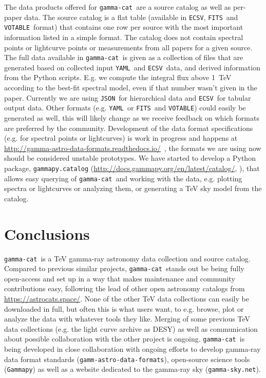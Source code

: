 \documentclass[11pt,twoside]{article}
\newcommand{\gammacat}{\texttt{gamma-cat}}
\newcommand{\gammapy}{\texttt{Gammapy}}
\newcommand{\gadf}{\texttt{gamm-astro-data-formats}}
\newcommand{\gammasky}{\texttt{gamma-sky.net}}
\newcommand{\yaml}{\texttt{YAML}}
\newcommand{\ecsv}{\texttt{ECSV}}
\newcommand{\fits}{\texttt{FITS}}
\newcommand{\votable}{\texttt{VOTABLE}}
\newcommand{\json}{\texttt{JSON}}
\newcommand{\astrocats}{\url{https://astrocats.space/}}
\newcommand{\gadfurl}{\url{http://gamma-astro-data-formats.readthedocs.io/}}
\newcommand{\gammapycat}{\url{http://docs.gammapy.org/en/latest/catalog/}}
\begin{document}
The data products offered for \gammacat\ are a source catalog as well as
per-paper data. The source catalog is a flat table (available in \ecsv, \fits\
and \votable\ format) that contains one row per source with the most important
information listed in a simple format. The catalog does not contain spectral
points or lightcurve points or measurements from all papers for a given source.
The full data available in \gammacat\ is given as a collection of files that are
generated based on collected input \yaml\ and \ecsv\ data, and derived
information from the Python scripts. E.g. we compute the integral flux above
1~TeV according to the best-fit spectral model, even if that number wasn't given
in the paper. Currently we are using \json\ for hierarchical data and \ecsv\ for
tabular output data. Other formats (e.g. \yaml\ or \fits\ and \votable) could
easily be generated as well, this will likely change as we receive feedback on
which formats are preferred by the community. Development of the data format
specifications (e.g. for spectral points or lightcurves) is work in progress and
happens at \gadfurl\ \citep{open-gamma}, the formats we are using now should be
considered unstable prototypes. We have started to develop a Python package,
\texttt{gammapy.catalog} (\gammapycat, \citet{gammapy}), that allows easy
querying of \gammacat\ and working with the data, e.g. plotting spectra or
lightcurves or analyzing them, or generating a TeV sky model from the catalog.

\section{Conclusions}
\label{sec:conclusions}

\gammacat\ is a TeV gamma-ray astronomy data collection and source catalog.
Compared to previous similar projects, \gammacat\ stands out be being fully
open-access and set up in a way that makes maintenance and community
contributions easy, following the lead of other open astronomy catalogs from
\astrocats. None of the other TeV data collections can easily be downloaded in
full, but often this is what users want, to e.g. browse, plot or analyze the
data with whatever tools they like. Merging of some previous TeV data
collections (e.g. the light curve archive as DESY) as well as communication
about possible collaboration with the other project is ongoing. \gammacat\ is
being developed in close collaboration with ongoing efforts to develop gamma-ray
data format standards (\gadf), open-source science tools (\gammapy) as well as a
website dedicated to the gamma-ray sky (\gammasky).
\end{document}
